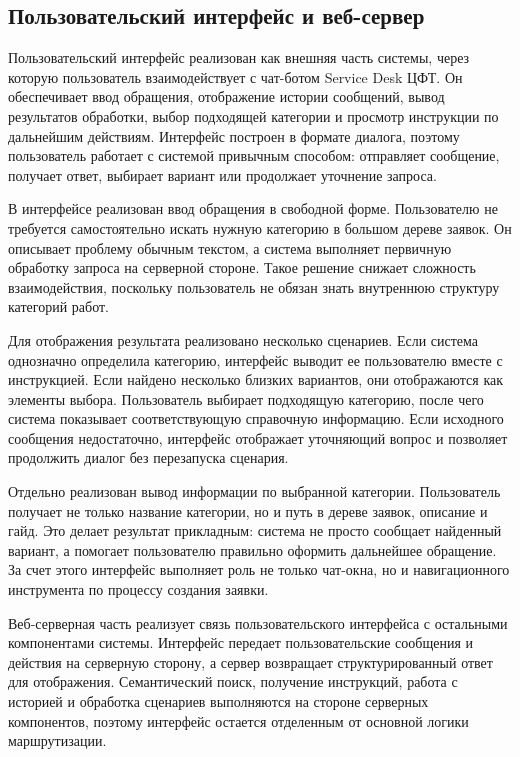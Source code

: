 \documentclass[14pt,a4paper]{extarticle}
\numberwithin{figure}{section}
\numberwithin{table}{section}
\begin{document}
\subsection{Пользовательский интерфейс и
веб-сервер}

Пользовательский интерфейс реализован как внешняя часть системы, через
которую пользователь взаимодействует с чат-ботом Service Desk ЦФТ. Он
обеспечивает ввод обращения, отображение истории сообщений, вывод
результатов обработки, выбор подходящей категории и просмотр инструкции
по дальнейшим действиям. Интерфейс построен в формате диалога, поэтому
пользователь работает с системой привычным способом: отправляет
сообщение, получает ответ, выбирает вариант или продолжает уточнение
запроса.

В интерфейсе реализован ввод обращения в свободной форме. Пользователю
не требуется самостоятельно искать нужную категорию в большом дереве
заявок. Он описывает проблему обычным текстом, а система выполняет
первичную обработку запроса на серверной стороне. Такое решение снижает
сложность взаимодействия, поскольку пользователь не обязан знать
внутреннюю структуру категорий работ.

Для отображения результата реализовано несколько сценариев. Если система
однозначно определила категорию, интерфейс выводит ее пользователю вместе
с инструкцией. Если найдено несколько близких вариантов, они
отображаются как элементы выбора. Пользователь выбирает подходящую
категорию, после чего система показывает соответствующую справочную
информацию. Если исходного сообщения недостаточно, интерфейс отображает
уточняющий вопрос и позволяет продолжить диалог без перезапуска
сценария.

Отдельно реализован вывод информации по выбранной категории.
Пользователь получает не только название категории, но и путь в дереве
заявок, описание и гайд. Это делает результат прикладным: система не
просто сообщает найденный вариант, а помогает пользователю правильно
оформить дальнейшее обращение. За счет этого интерфейс выполняет роль не
только чат-окна, но и навигационного инструмента по процессу создания
заявки.

Веб-серверная часть реализует связь пользовательского интерфейса с
остальными компонентами системы. Интерфейс передает пользовательские
сообщения и действия на серверную сторону, а сервер возвращает
структурированный ответ для отображения. Семантический поиск, получение
инструкций, работа с историей и обработка сценариев выполняются на
стороне серверных компонентов, поэтому интерфейс остается отделенным от
основной логики маршрутизации.
\end{document}
